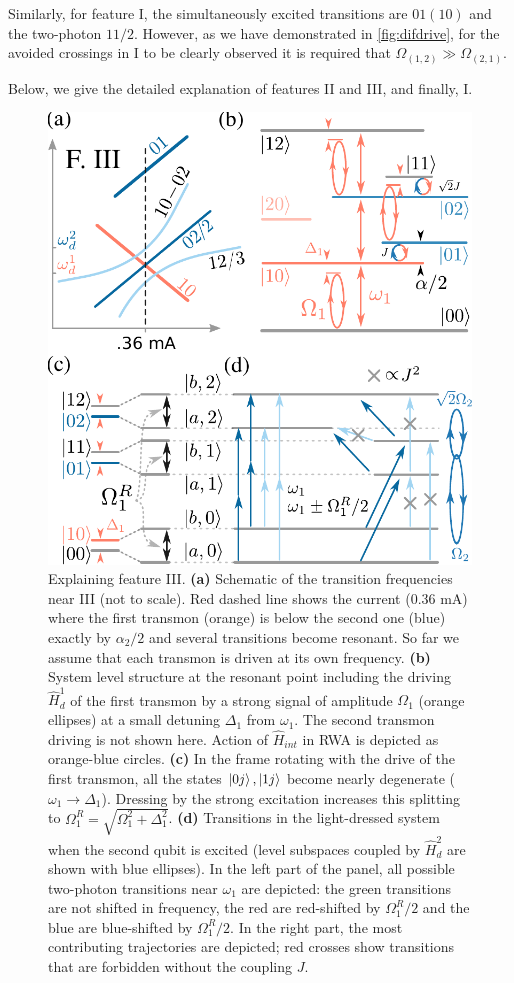 \documentclass[%
 aip,
 amsmath,amssymb,
 reprint,%
]{revtex4-1}
\begin{document}
Similarly, for feature I, the simultaneously excited transitions are $01 (10)$ and the two-photon $11/2$. However, as we have demonstrated in \autoref{fig:difdrive}, for the avoided crossings in I to be clearly observed it is required that $\Omega_{(1,2)} \gg \Omega_{(2,1)}$. 

Below, we give the detailed explanation of features II and III, and finally, I.

\begin{figure}
	\centering
	\includegraphics[width=\linewidth]{main_scheme_2}  
	\caption{Explaining feature III. \textbf{(a)} Schematic of the transition frequencies near III (not to scale). Red dashed line shows the current (0.36 mA) where the first transmon (orange) is below the second one (blue) exactly by $\alpha_2/2$ and several transitions become resonant. So far we assume that each transmon is driven at its own frequency. \textbf{(b)} System level structure at the resonant point including the driving $\hat H_{d}^1$ of the first transmon by a strong signal of amplitude $\Omega_1$ (orange ellipses) at a small detuning $\Delta_1$ from $\omega_1$. The second transmon driving is not shown here. Action of $\hat H_{int}$ in RWA is depicted as orange-blue circles. \textbf{(c)} In the frame rotating with the drive of the first transmon, all the states $\ket{0j},\ket{1j}$ become nearly degenerate ($\omega_1 \rightarrow \Delta_1$). Dressing by the strong excitation increases this splitting to $\Omega_1^R = \sqrt{\Omega_1^2 + \Delta_1^2}$. \textbf{(d)} Transitions in the light-dressed system when the second qubit is excited (level subspaces coupled by $\hat H_{d}^2$ are shown with blue ellipses). In the left part of the panel, all possible two-photon transitions near $\omega_1$ are depicted: the green transitions are not shifted in frequency, the red are red-shifted by $\Omega^R_1/2$ and the blue are blue-shifted by $\Omega^R_1/2$. In the right part, the most contributing trajectories are depicted; red crosses show transitions that are forbidden without the coupling $J$.}

\end{figure}
\end{document}
